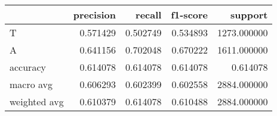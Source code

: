 \begin{tabular}{lrrrr}
\toprule
{} &  precision &    recall &  f1-score &      support \\
\midrule
T            &   0.571429 &  0.502749 &  0.534893 &  1273.000000 \\
A            &   0.641156 &  0.702048 &  0.670222 &  1611.000000 \\
accuracy     &   0.614078 &  0.614078 &  0.614078 &     0.614078 \\
macro avg    &   0.606293 &  0.602399 &  0.602558 &  2884.000000 \\
weighted avg &   0.610379 &  0.614078 &  0.610488 &  2884.000000 \\
\bottomrule
\end{tabular}
